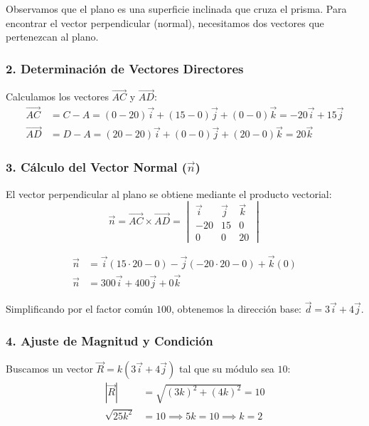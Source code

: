 \documentclass[12pt, a4paper]{article}
\begin{document}
Observamos que el plano es una superficie inclinada que cruza el prisma. Para encontrar el vector perpendicular (normal), necesitamos dos vectores que pertenezcan al plano.

\subsubsection*{2. Determinación de Vectores Directores}
Calculamos los vectores $\vec{AC}$ y $\vec{AD}$:
\begin{align*}
    \vec{AC} &= C - A = (0 - 20)\vec{i} + (15 - 0)\vec{j} + (0 - 0)\vec{k} = -20\vec{i} + 15\vec{j} \\
    \vec{AD} &= D - A = (20 - 20)\vec{i} + (0 - 0)\vec{j} + (20 - 0)\vec{k} = 20\vec{k}
\end{align*}

\subsubsection*{3. Cálculo del Vector Normal ($\vec{n}$)}
El vector perpendicular al plano se obtiene mediante el producto vectorial:
\begin{equation*}
    \vec{n} = \vec{AC} \times \vec{AD} = \begin{vmatrix} 
    \vec{i} & \vec{j} & \vec{k} \\ 
    -20 & 15 & 0 \\ 
    0 & 0 & 20 
    \end{vmatrix}
\end{equation*}

\begin{align*}
    \vec{n} &= \vec{i}(15 \cdot 20 - 0) - \vec{j}(-20 \cdot 20 - 0) + \vec{k}(0) \\
    \vec{n} &= 300\vec{i} + 400\vec{j} + 0\vec{k}
\end{align*}

Simplificando por el factor común $100$, obtenemos la dirección base: $\vec{d} = 3\vec{i} + 4\vec{j}$.

\subsubsection*{4. Ajuste de Magnitud y Condición}
Buscamos un vector $\vec{R} = k(3\vec{i} + 4\vec{j})$ tal que su módulo sea $10$:
\begin{align*}
    |\vec{R}| &= \sqrt{(3k)^2 + (4k)^2} = 10 \\
    \sqrt{25k^2} &= 10 \implies 5k = 10 \implies k = 2
\end{align*}
\end{document}
